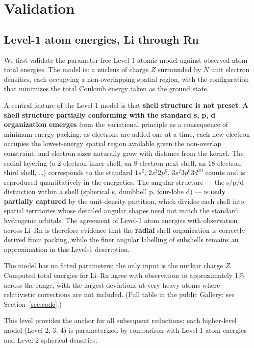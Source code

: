 \documentclass[11pt]{article}
\begin{document}
\section{Validation}\label{sec:validation}

\subsection{Level-1 atom energies, Li through Rn}\label{sec:atoms}

We first validate the parameter-free Level-1 atomic model against observed atom total energies. The model is: a nucleus of charge $Z$ surrounded by $N$ unit electron densities, each occupying a non-overlapping spatial region, with the configuration that minimizes the total Coulomb energy taken as the ground state.

A central feature of the Level-1 model is that \textbf{shell structure is not preset}. \textbf{A shell structure partially conforming with the standard s, p, d organization emerges} from the variational principle as a consequence of minimum-energy packing: as electrons are added one at a time, each new electron occupies the lowest-energy spatial region available given the non-overlap constraint, and electron sizes naturally grow with distance from the kernel. The radial layering (a 2-electron inner shell, an 8-electron next shell, an 18-electron third shell, \ldots) corresponds to the standard $1s^2$, $2s^2 2p^6$, $3s^2 3p^6 3d^{10}$ counts and is reproduced quantitatively in the energetics. The angular structure --- the s/p/d distinction within a shell (spherical s, dumbbell p, four-lobe d) --- is \textbf{only partially captured} by the unit-density partition, which divides each shell into spatial territories whose detailed angular shapes need not match the standard hydrogenic orbitals. The agreement of Level-1 atom energies with observation across Li--Rn is therefore evidence that the \textbf{radial} shell organization is correctly derived from packing, while the finer angular labelling of subshells remains an approximation in this Level-1 description.

The model has no fitted parameters; the only input is the nuclear charge $Z$. Computed total energies for Li--Rn agree with observation to approximately 1\% across the range, with the largest deviations at very heavy atoms where relativistic corrections are not included. (Full table in the public Gallery; see Section~\ref{sec:code}.)

This level provides the anchor for all subsequent reductions: each higher-level model (Level 2, 3, 4) is parameterized by comparison with Level-1 atom energies and Level-2 spherical densities.
\end{document}
